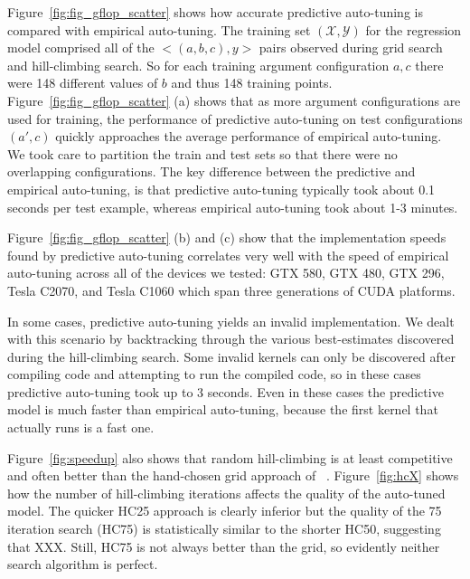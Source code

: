 \documentclass{sig-alternate}
\begin{document}

Figure~\ref{fig:fig_gflop_scatter} shows how accurate predictive auto-tuning is compared with empirical auto-tuning.
The training set $(\mathcal{X}, \mathcal{Y})$ for the regression model comprised
all of the $<(a,b,c), y>$ pairs observed during grid search and hill-climbing search.
So for each training argument configuration $a,c$ there were 148 different values of $b$ and thus 148 training points.
Figure~\ref{fig:fig_gflop_scatter} (a) shows that as more argument configurations are used for training,
the performance of predictive auto-tuning on test configurations $(a', c)$ quickly
approaches the average performance of empirical auto-tuning.
We took care to partition the train and test sets so that there were no overlapping configurations.
The key difference between the predictive and empirical auto-tuning,
is that predictive auto-tuning
typically took about 0.1 seconds per test example, whereas empirical auto-tuning took about 1-3 minutes.

Figure~\ref{fig:fig_gflop_scatter} (b) and (c) show that the implementation speeds found by predictive auto-tuning correlates very well with the speed of empirical auto-tuning across all of the devices we tested: GTX 580, GTX 480, GTX 296, Tesla C2070, and Tesla C1060 which span three generations of CUDA platforms.

In some cases, predictive auto-tuning yields an invalid implementation.  We
dealt with this scenario by backtracking through the various best-estimates
discovered during the hill-climbing search.  Some invalid kernels can only be
discovered after compiling code and attempting to run the compiled code, so in
these cases predictive auto-tuning took up to 3 seconds.  Even in these cases
the predictive model is much faster than empirical auto-tuning, because the
first kernel that actually runs is a fast one.

Figure~\ref{fig:speedup} also shows that random hill-climbing is at least
competitive and often better than the hand-chosen grid approach of ~\citet{pinto+cox:2011gcg}.  Figure~\ref{fig:hcX} shows how the number of hill-climbing iterations
affects the quality of the auto-tuned model.
The quicker HC25 approach is clearly inferior but the quality of the 75 iteration search (HC75) is statistically similar to the shorter HC50, suggesting that XXX.
Still, HC75 is not always better than the grid, so evidently neither search algorithm is perfect.
\end{document}
